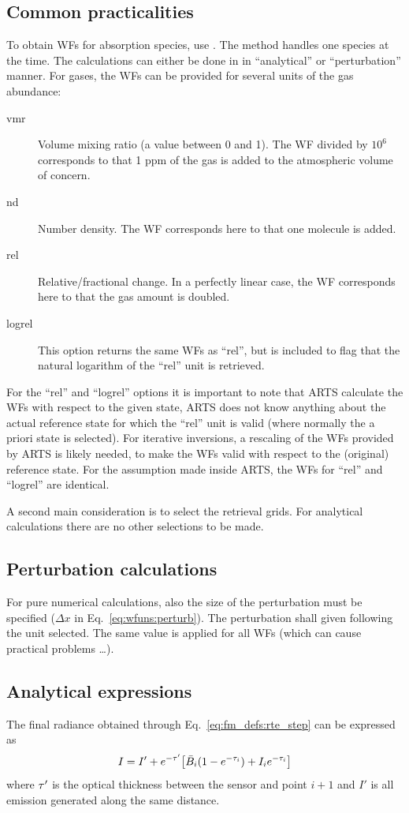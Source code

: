 \subsection{Common practicalities}
%
To obtain WFs for absorption species, use . The
method handles one species at the time. The calculations can either be done in
in ``analytical'' or ``perturbation'' manner.
For gases, the WFs can be provided for several units of the gas abundance:
\begin{description}
\item[vmr] Volume mixing ratio (a value between 0 and 1). The WF divided by
  $10^6$ corresponds to that 1 ppm of the gas is added to the atmospheric
  volume of concern.
\item[nd] Number density. The WF corresponds here to that one molecule is added.
\item[rel] Relative/fractional change. In a perfectly linear case, the WF
  corresponds here to that the gas amount is doubled.
\item[logrel] This option returns the same WFs as ``rel'', but is included to
  flag that the natural logarithm of the ``rel'' unit is retrieved.
\end{description}
For the ``rel'' and ``logrel'' options it is important to note that ARTS
calculate the WFs with respect to the given state, ARTS does not know anything
about the actual reference state for which the ``rel'' unit is valid (where
normally the a priori state is selected). For iterative inversions, a rescaling
of the WFs provided by ARTS is likely needed, to make the WFs valid with
respect to the (original) reference state. For the assumption made inside ARTS,
the WFs for ``rel'' and ``logrel'' are identical.

A second main consideration is to select the retrieval grids. For analytical
calculations there are no other selections to be made. 


\subsection{Perturbation calculations}
%
For pure numerical calculations, also the size of the perturbation must
be specified ($\Delta x$ in Eq.~\ref{eq:wfuns:perturb}). The perturbation shall
given following the unit selected. The same value is applied for all WFs (which
can cause practical problems \dots).


\subsection{Analytical expressions}
%
The final radiance obtained through Eq.~\ref{eq:fm_defs:rte_step} can be
expressed as
\begin{equation}
  \label{eq:I4J}
  I = I'+ e^{-\tau'}\!\left[ \bar{B}_i(1-e^{-\tau_{i}})+I_ie^{-\tau_{i}}\right]
\end{equation}
where $\tau'$ is the optical thickness between the sensor and point $i+1$
and $I'$ is all emission generated along the same distance.

